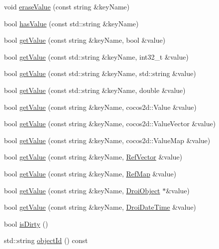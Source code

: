 \begin{DoxyCompactItemize}
void \hyperlink{class_droi_object_a9fef9203b220694f28b423ab4611ecad}{erase\+Value} (const string \&key\+Name)
\item 
bool \hyperlink{class_droi_object_a6b501c82a56dd1ca67bc3b488e808565}{has\+Value} (const std\+::string \&key\+Name)
\item 
bool \hyperlink{class_droi_object_a0d9c5af32df88e7c26f2facd58e104c2}{get\+Value} (const string \&key\+Name, bool \&value)
\item 
bool \hyperlink{class_droi_object_a2a0204825653dca43d68baefcbecf92a}{get\+Value} (const std\+::string \&key\+Name, int32\+\_\+t \&value)
\item 
bool \hyperlink{class_droi_object_a71107e93cc5da4658950274775bdeb22}{get\+Value} (const std\+::string \&key\+Name, std\+::string \&value)
\item 
bool \hyperlink{class_droi_object_a4a48ba8c515eef9e691eaaa57ac9dc34}{get\+Value} (const std\+::string \&key\+Name, double \&value)
\item 
bool \hyperlink{class_droi_object_ac02151ba569b1a7b452c7f5125bbf72b}{get\+Value} (const string \&key\+Name, cocos2d\+::\+Value \&value)
\item 
bool \hyperlink{class_droi_object_a4ed4dfbafbe38cd1c1ef5125c8db9c29}{get\+Value} (const string \&key\+Name, cocos2d\+::\+Value\+Vector \&value)
\item 
bool \hyperlink{class_droi_object_a048d3bc941c78e44dd6e389f2c6c2236}{get\+Value} (const string \&key\+Name, cocos2d\+::\+Value\+Map \&value)
\item 
bool \hyperlink{class_droi_object_a3b2e0a1b0d601481c73ad0a05308cbf5}{get\+Value} (const string \&key\+Name, \hyperlink{class_ref_vector}{Ref\+Vector} \&value)
\item 
bool \hyperlink{class_droi_object_ad67d6a23ccc2b90de54465cd5f487a0d}{get\+Value} (const string \&key\+Name, \hyperlink{class_ref_map}{Ref\+Map} \&value)
\item 
bool \hyperlink{class_droi_object_a870c7a9bddf80f403d400faf0037500a}{get\+Value} (const string \&key\+Name, \hyperlink{class_droi_object}{Droi\+Object} $\ast$\&value)
\item 
bool \hyperlink{class_droi_object_a2a62c9b8d44a9116206e1f72c20f667a}{get\+Value} (const string \&key\+Name, \hyperlink{class_droi_date_time}{Droi\+Date\+Time} \&value)
\item 
bool \hyperlink{class_droi_object_a2d9b767f0c14e203a71b48b6b5d21b79}{is\+Dirty} ()
\item 
std\+::string \hyperlink{class_droi_object_ac9bf5e770979e063460ee5a8bb0da738}{object\+Id} () const

\end{DoxyCompactItemize}
